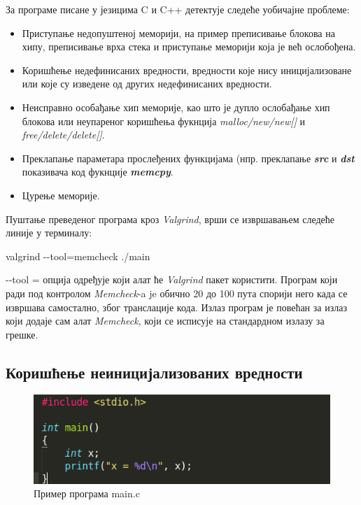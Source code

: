 \documentclass[12pt,oneside]{memoir}
\begin{document}
\indent За програме писане у језицима C и C++ детектује следеће уобичајне проблеме:
\begin{itemize}
  \item Приступање недопуштеној меморији, на пример преписивање блокова на хипу, преписивање врха стека и приступање меморији која је већ ослобођена.
  \item Коришћење недефинисаних вредности, вредности које нису иницијализоване или које су изведене од других недефинисаних вредности.
  \item Неисправно особађање хип меморије, као што је дупло ослобађање хип блокова или неупареног коришћења фукнција \textit{malloc/new/new[]} и \textit{free/delete/delete[]}.
  \item Преклапање параметара прослеђених функцијама (нпр. преклапање \textbf{\textit{src}} и \textbf{\textit{dst}} показивача код фукнције \textbf{\textit{memcpy}}.
  \item Цурење меморије.
\end{itemize}

\indent Пуштање преведеног програма кроз \textit{Valgrind}, врши се извршавањем следеће линије у терминалу:

\begin{center}
 valgrind -\--tool=memcheck ./main
\end{center}

\indent -\--tool = опција одређује који алат ће \textit{Valgrind} пакет користити. Програм који ради под контролом \textit{Memcheck}-a je обично 20 до 100 пута спорији него када се извршава самостално, због транслације кода. Излаз програм је повећан за излаз који додаје сам алат \textit{Memcheck}, који се исписује на стандардном излазу за грешке.



\subsection{Коришћење неиницијализованих вредности}

\begin{figure}[h!]
\begin{center}
\includegraphics[scale=0.75]{slika1.png}
\end{center}
\caption{Пример програма main.c}
\label{fig:main}
\end{figure}
\end{document}
